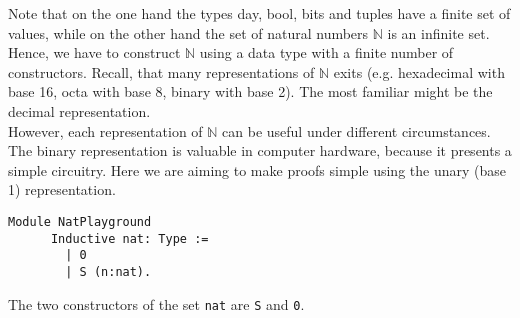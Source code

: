 	  Note that on the one hand the types day, bool, bits and tuples have a finite set of values, while on the other hand the set of natural numbers $\mathbb{N}$ is an infinite set.\\ 
	  Hence, we have to construct $\mathbb{N}$ using a data type with a finite number of constructors. 
	  Recall, that many representations of $\mathbb{N}$ exits (e.g. hexadecimal with base 16, octa with base 8, binary with base 2).
	  The most familiar might be the decimal representation.\\
	  However, each representation of $\mathbb{N}$ can be useful under different circumstances. 
	  The binary representation is valuable in computer hardware, because it presents a simple circuitry.
	  Here we are aiming to make proofs simple using the unary (base 1) representation.
	  
	  \begin{lstlisting}[caption={\lstinline!nat!}, label=lst:DefNat]
	  Module NatPlayground
	  Inductive nat: Type :=
	    | 0
	    | S (n:nat).
	  \end{lstlisting}  
	  The two constructors of the set \lstinline!nat! are \lstinline!S! and \lstinline!0!. \\
	
